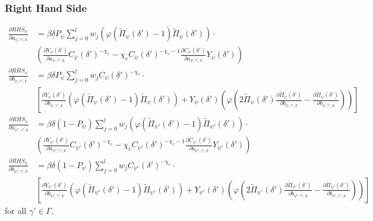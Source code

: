\documentclass[11pt]{article}
\begin{document}
\subsubsection*{Right Hand Side}
\begin{align}
\frac{\partial RHS_{\psi}}{\partial a_{\psi,\gamma',k}} &= \beta\delta P_{\psi}\sum_{j = 0}^{l}w_j\left(\varphi(\tilde{\Pi}_{\psi}(\delta') - 1)\tilde{\Pi}_{\psi}(\delta')\right)\cdot\nonumber \\ 
&\left(\frac{\partial Y_{\psi}(\delta')}{\partial a_{\psi,\gamma',k}}C_{\psi}(\delta')^{-\chi_c} - \chi_cC_{\psi}(\delta')^{-\chi_c - 1}\frac{\partial C_{\psi}(\delta')}{\partial a_{\psi,\gamma',k}}Y_{\psi}(\delta')\right) \\
\frac{\partial RHS_{\psi}}{\partial b_{\psi,\gamma',k}} &=  \beta\delta P_{\psi}\sum_{j = 0}^{l}w_jC_{\psi}(\delta')^{-\chi_c}\cdot\nonumber \\ 
&\left[\frac{\partial Y_{\psi}(\delta')}{\partial b_{\psi,\gamma',k}}\left(\varphi(\tilde{\Pi}_{\psi}(\delta') - 1)\tilde{\Pi}_{\psi}(\delta')\right) + Y_{\psi}(\delta')\left(\varphi\left(2\tilde{\Pi}_{\psi}(\delta')\frac{\partial \tilde{\Pi}_{\psi}(\delta')}{\partial b_{\psi,\gamma',k}} - \frac{\partial \tilde{\Pi}_{\psi}(\delta')}{\partial b_{\psi,\gamma',k}}\right)\right)\right]\\
\frac{\partial RHS_{\psi}}{\partial a_{\psi',\gamma',k}} &= \beta\delta(1- P_{\psi})\sum_{j = 0}^{l}w_j\left(\varphi(\tilde{\Pi}_{\psi'}(\delta') - 1)\tilde{\Pi}_{\psi'}(\delta')\right)\cdot\nonumber \\ 
&\left(\frac{\partial Y_{\psi'}(\delta')}{\partial a_{\psi',\gamma',k}}C_{\psi'}(\delta')^{-\chi_c} - \chi_cC_{\psi'}(\delta')^{-\chi_c - 1}\frac{\partial C_{\psi'}(\delta')}{\partial a_{\psi',\gamma',k}}Y_{\psi'}(\delta')\right) \\
\frac{\partial RHS_{\psi}}{\partial b_{\psi',\gamma',k}} &=  \beta\delta(1- P_{\psi})\sum_{j = 0}^{l}w_jC_{\psi'}(\delta')^{-\chi_c}\cdot\nonumber \\ &\left[\frac{\partial Y_{\psi'}(\delta')}{\partial b_{\psi',\gamma',k}}\left(\varphi(\tilde{\Pi}_{\psi'}(\delta') - 1)\tilde{\Pi}_{\psi'}(\delta')\right) + Y_{\psi'}(\delta')\left(\varphi\left(2\tilde{\Pi}_{\psi'}(\delta')\frac{\partial \tilde{\Pi}_{\psi'}(\delta')}{\partial b_{\psi',\gamma',k}} - \frac{\partial \tilde{\Pi}_{\psi'}(\delta')}{\partial b_{\psi',\gamma',k}}\right)\right)\right] 
\end{align}
for all $\gamma'\in\Gamma$.
\end{document}
